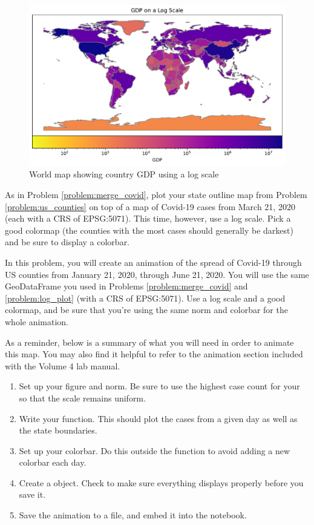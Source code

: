 \begin{figure}[H]
\begin{center}
\includegraphics[scale=.7]{figures/world_log.pdf}
\end{center}
\caption{World map showing country GDP using a log scale}
\label{figure:log_world}
\end{figure}

\begin{problem}
As in Problem \ref{problem:merge_covid}, plot your state outline map from Problem \ref{problem:us_counties} on top of a map of Covid-19 cases from March 21, 2020 (each with a CRS of EPSG:5071).
This time, however, use a log scale.
Pick a good colormap (the counties with the most cases should generally be darkest) and be sure to display a colorbar.
\label{problem:log_plot}
\end{problem}

\begin{problem}
In this problem, you will create an animation of the spread of Covid-19 through US counties from January 21, 2020, through June 21, 2020.
You will use the same GeoDataFrame you used in Problems \ref{problem:merge_covid} and \ref{problem:log_plot} (with a CRS of EPSG:5071).
Use a log scale and a good colormap, and be sure that you're using the same norm and colorbar for the whole animation.

As a reminder, below is a summary of what you will need in order to animate this map.
You may also find it helpful to refer to the animation section included with the Volume 4 lab manual.

\begin{enumerate}
	\item Set up your figure and norm. Be sure to use the highest case count for your  so that the scale remains uniform.
	\item Write your  function. This should plot the cases from a given day as well as the state boundaries.
	\item Set up your colorbar. Do this outside the  function to avoid adding a new colorbar each day.
	\item Create a  object. Check to make sure everything displays properly before you save it.
	\item Save the animation to a file, and embed it into the notebook.
\end{enumerate}
\end{problem}

